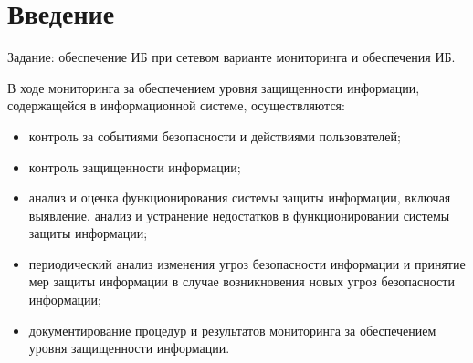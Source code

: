 \section*{Введение}


Задание: обеспечение ИБ при сетевом варианте мониторинга и обеспечения ИБ.

В ходе мониторинга за обеспечением уровня защищенности информации, содержащейся в информационной системе, осуществляются:

\begin{itemize}
	\item контроль за событиями безопасности и действиями пользователей;
	\item контроль защищенности информации;
	\item анализ и оценка функционирования системы защиты информации, включая выявление, анализ и устранение недостатков в функционировании системы защиты информации;
	\item периодический анализ изменения угроз безопасности информации и принятие мер защиты информации в случае возникновения новых угроз безопасности информации;
	\item документирование процедур и результатов мониторинга за обеспечением уровня защищенности информации.
\end{itemize}

